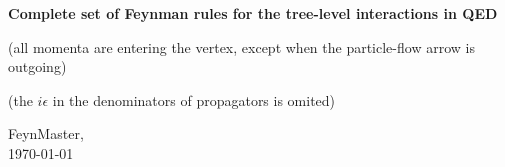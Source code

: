 \documentclass[a4paper,12pt,twoside]{report}
\begin{document}
 
 
\begin{center} 
\textbf{\large \color{dgreen} Complete set of Feynman rules for the tree-level interactions in QED}

\vspace{1mm}

{\footnotesize \color{gray} (all momenta are entering the vertex, except when the particle-flow arrow is outgoing)}

{\footnotesize \color{gray} (the $ i \epsilon $ in the denominators of propagators is omited)}

\vspace{2mm}

\end{center}

\vspace{1cm}
\raggedright
FeynMaster,\\[1mm]
\today 
\end{document}
